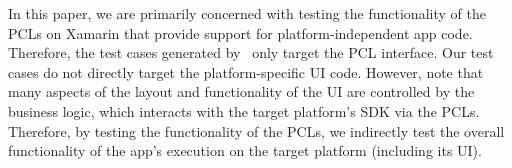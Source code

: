 
In this paper, we are primarily concerned with testing the functionality of the
PCLs on Xamarin that provide support for platform-independent app code.
Therefore, the test cases generated by \tool\ only target the PCL interface.
Our test cases do not directly target the platform-specific UI code. However,
note that many aspects of the layout and functionality of the UI are controlled
by the business logic, which interacts with the target platform's SDK via the
PCLs.  Therefore, by testing the functionality of the PCLs, we indirectly test
the overall functionality of the app's execution on the target platform
(including its UI).
